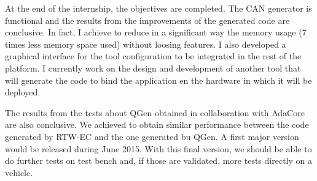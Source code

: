 At the end of the internship, the objectives are completed. The CAN generator is functional and the results from the improvements of the generated code are conclusive. In fact, I achieve to reduce in a significant way the memory usage (7 times less memory space used) without loosing features. I also developed a graphical interface for the tool configuration to be integrated in the rest of the platform. I currently work on the design and development of another tool that will generate the code to bind the application en the hardware in which it will be deployed.

The results from the tests about QGen obtained in collaboration with AdaCore are also conclusive. We achieved to obtain similar performance between the code generated by RTW-EC\up{\circledR} and the one generated bu QGen. A first major version would be released during June 2015. With this final version, we should be able to do further tests on test bench and, if those are validated, more tests directly on a vehicle.





